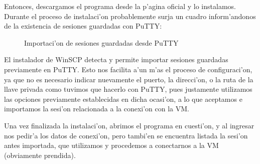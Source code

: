 \documentclass[11pt]{article}
\begin{document}
	Entonces, descargamos el programa desde la p'agina oficial y lo instalamos. Durante el proceso de instalaci'on probablemente surja un cuadro inform'andonos de la existencia de sesiones guardadas con PuTTY:
	
	\begin{figure}[H]
		\centering	\captionsetup{justification=centering}
		\hfill
		 \vspace{7pt}
		\caption{Importaci'on de sesiones guardadas desde PuTTY}
	\end{figure}

	El instalador de WinSCP detecta y permite importar sesiones guardadas previamente en PuTTY. Esto nos facilita a'un m'as el proceso de configuraci'on, ya que no es necesario indicar nuevamente el puerto, la direcci'on, o la ruta de la llave privada como tuvimos que hacerlo con PuTTY, pues justamente utilizamos las opciones previamente establecidas en dicha ocasi'on, a lo que aceptamos e importamos la sesi'on relacionada a la conexi'on con la VM.
	
	Una vez finalizada la instalaci'on, abrimos el programa en cuesti'on, y al ingresar nos pedir'a los datos de conexi'on, pero tambi'en se encuentra listada la sesi'on antes importada, que utilizamos y procedemos a conectarnos a la VM (obviamente prendida).
	
\end{document}
